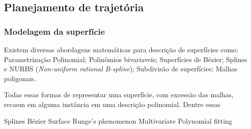 \subsection{Planejamento de trajetória}

\subsubsection{Modelagem da superfície}\label{modelagem}

%





Existem diversas abordagens matemáticas para descrição de superfícies como:
Parametrização Polinomial; Polinômios bivariaveis; Superfícies de
Bézier; Splines e NURBS (\textit{Non-uniform rational B-spline}); Subdivisão de
superfícies; Malhas poligonais.

Todas essas formas de representar uma superfície, com excessão das malhas,
recaem em alguma instância em uma descrição polinomial. Dentre essas




Splines
Bézier Surface
Runge's phenomenon
Multivariate Polynomial fitting



